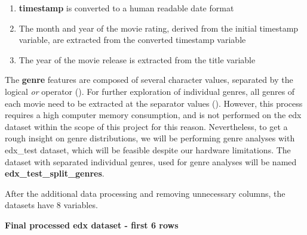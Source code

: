 \documentclass[
]{article}
\begin{document}
\begin{enumerate}
\def\labelenumi{\arabic{enumi}.}
\item
  \textbf{timestamp} is converted to a human readable date format
\item
  The month and year of the movie rating, derived from the initial
  timestamp variable, are extracted from the converted timestamp
  variable
\item
  The year of the movie release is extracted from the title variable
\end{enumerate}

The \textbf{genre} features are composed of several character values,
separated by the logical \emph{or} operator (\textbar). For further
exploration of individual genres, all genres of each movie need to be
extracted at the separator values (\textbar). However, this process
requires a high computer memory consumption, and is not performed on the
edx dataset within the scope of this project for this reason.
Nevertheless, to get a rough insight on genre distributions, we will be
performing genre analyses with edx\_test dataset, which will be feasible
despite our hardware limitations. The dataset with separated individual
genres, used for genre analyses will be named
\textbf{edx\_test\_split\_genres}.

After the additional data processing and removing unnecessary columns,
the datasets have 8 variables.

\textbf{Final processed edx dataset - first 6 rows}

\begin{table}[H]
\centering\begingroup\fontsize{10}{12}\selectfont

\endgroup{}
\end{table}
\end{document}
